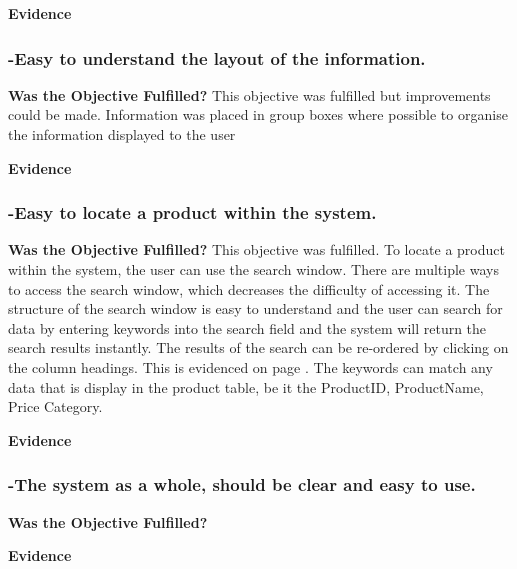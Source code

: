 \textbf{Evidence} \newline

\subsubsection{-Easy to understand the layout of the information.}
\textbf{Was the Objective Fulfilled?} \newline
This objective was fulfilled but improvements could be made. Information was placed in group boxes where possible to organise the information displayed to the user \newline

\textbf{Evidence} \newline




\subsubsection{-Easy to locate a product within the system.}
\textbf{Was the Objective Fulfilled?} \newline
This objective was fulfilled. To locate a product within the system, the user can use the search window. There are multiple ways to access the search window, which decreases the difficulty of accessing it. The structure of the search window is easy to understand and the user can search for data by entering keywords into the search field and the system will return the search results instantly. The results of the search can be re-ordered by clicking on the column headings. This is evidenced on page \pageref{}. The keywords can match any data that is display in the product table, be it the ProductID, ProductName, Price Category.\newline

\textbf{Evidence} \newline





\subsubsection{-The system as a whole, should be clear and easy to use.}
\textbf{Was the Objective Fulfilled?} \newline

\textbf{Evidence} \newline





